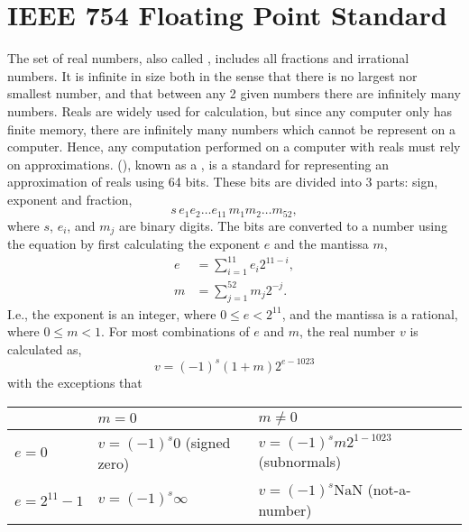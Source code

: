 \documentclass[fsharpNotes.tex]{subfiles}
\begin{document}
\section{IEEE 754 Floating Point Standard}
\label{sec:floatingPoint}
The set of real numbers, also called , includes all fractions and irrational numbers. It is infinite in size both in the sense that there is no largest nor smallest number, and that between any 2 given numbers there are infinitely many numbers. Reals are widely used for calculation, but since any computer only has finite memory, there are infinitely many numbers which cannot be represent on a computer. Hence, any computation performed on a computer with reals must rely on approximations.  (), known as a , is a standard for representing an approximation of reals using 64 bits. These bits are divided into 3 parts: sign, exponent and fraction, 
\begin{displaymath}
  s\, e_1 e_2 \ldots e_{11}\, m_1 m_2 \ldots m_{52},
\end{displaymath}
where $s$, $e_i$, and $m_j$ are binary digits. The bits are converted to a number using the equation by first calculating the exponent $e$ and the mantissa $m$,
\begin{align}
  e &= \sum _{i=1}^{11}e_i2^{11-i},\\
  m & = \sum _{j=1}^{52}m_j2^{-j}.
\end{align}
I.e., the exponent is an integer, where $0 \leq e < 2^{11}$, and the mantissa is a rational, where $0 \leq m < 1$. For most combinations of $e$ and $m$, the real number $v$ is calculated as,
\begin{equation}
  v = \left(-1\right)^{s} \left(1+m\right) 2^{e-1023}
\end{equation}
 with the exceptions that
\begin{center}
  \begin{tabular}{|l|l|l|}
    \hline
    \rowcolor{headerRowColor}& $m=0$                                   & $m\neq 0$\\
    \hline
    $e=0$           & $v = \left(-1\right)^{s} 0$ (signed zero) & $v = \left(-1\right)^{s} m 2^{1-1023}$ (subnormals)\\
    \hline 
    $e=2^{11}-1$ & $v = \left(-1\right)^{s} \infty$               & $v = \left(-1\right)^{s} \text{NaN}$ (not-a-number)\\
    \hline
  \end{tabular}
\end{center}
\end{document}
